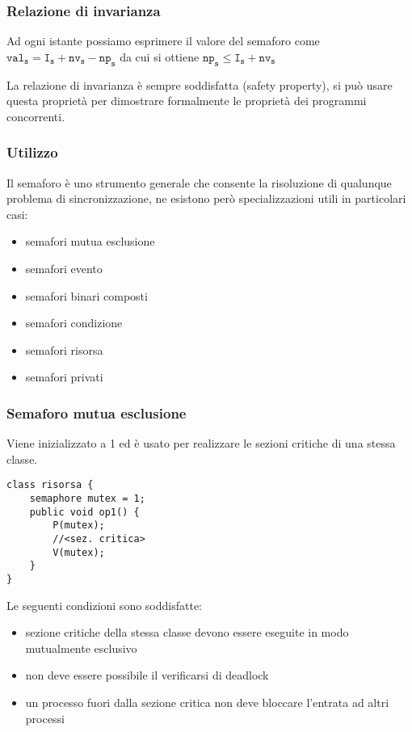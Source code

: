 \subsubsection{Relazione di invarianza}
Ad ogni istante possiamo esprimere il valore del semaforo come $\texttt{val}_\texttt{s} = \texttt{I}_\texttt{s} + \texttt{nv}_\texttt{s} - \texttt{np}_\texttt{s}$ da cui si ottiene $\texttt{np}_\texttt{s}\le \texttt{I}_\texttt{s}+\texttt{nv}_\texttt{s}$

La relazione di invarianza è sempre soddisfatta (safety property), si può usare questa proprietà per dimostrare formalmente le proprietà dei programmi concorrenti.

\subsubsection{Utilizzo}
Il semaforo è uno strumento generale che consente la risoluzione di qualunque problema di sincronizzazione, ne esistono però specializzazioni utili in particolari casi:
\begin{itemize}
    \item semafori mutua esclusione
    \item semafori evento
    \item semafori binari composti
    \item semafori condizione
    \item semafori risorsa
    \item semafori privati
\end{itemize}

\subsubsection{Semaforo mutua esclusione}

Viene inizializzato a 1 ed è usato per realizzare le sezioni critiche di una stessa classe.
\begin{verbatim}
class risorsa {
    semaphore mutex = 1;
    public void op1() {
        P(mutex);
        //<sez. critica>
        V(mutex);
    }
}
\end{verbatim}

Le seguenti condizioni sono soddisfatte:
\begin{itemize}
    \item sezione critiche della stessa classe devono essere eseguite in modo mutualmente esclusivo
    \item non deve essere possibile il verificarsi di deadlock
    \item un processo fuori dalla sezione critica non deve bloccare l'entrata ad altri processi
\end{itemize}


